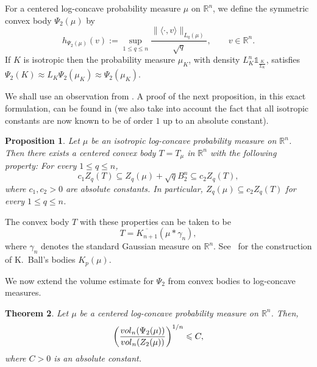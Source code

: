 \documentclass[10pt,a4paper]{amsart}
\newtheorem{theorem}{Theorem}[section]
\newtheorem{proposition}[theorem]{Proposition}
\numberwithin{equation}{section}
\newcommand{\ls}{\leqslant}
\begin{document}
For a centered log-concave probability measure $\mu$ on $\mathbb{R}^n$, we define the symmetric convex body $\Psi_{2}(\mu)$
by 
\begin{equation*} h_{\Psi_{2}(\mu)}(v ):= \sup_{1\ls q\ls n}\frac{\|\langle \cdot, v \rangle \|_{L_q(\mu)}}{\sqrt{q}}, \qquad v\in\mathbb{R}^n.\end{equation*} 
If $K$ is isotropic then the probability measure $\mu_K$, with density $L_K^n\mathds{1}_{\frac{K}{L_K}}$, satisfies $\Psi_2(K)\approx L_K\Psi_2(\mu_K)\approx \Psi_2(\mu_K)$.

We shall use an observation from \cite{GPV11}. A proof of the next proposition, in this exact formulation, can be found in \cite[Proposition~8.1.7]{BGVV-book}
(we also take into account the fact that all isotropic constants are now known to be of order $1$ up to an absolute constant).

\begin{proposition}\label{prop:Zq-control}
Let $\mu$ be an isotropic log-concave probability measure on $\mathbb{R}^n$. Then there exists a centered convex body $T=T_\mu$ in $\mathbb{R}^n$ with
the following property: For every $1\ls q\ls n$,
\begin{equation*}c_1Z_q(T)\subseteq Z_q(\mu)+\sqrt{q}B_2^n\subseteq c_2 Z_q(T),\end{equation*} 
where $c_1,c_2>0$ are absolute constants. In particular, $Z_q(\mu)\subseteq c_2Z_q(T)$ for every $1\ls q\ls n$.
\end{proposition} 

The convex body $T$ with these properties can be taken to be
\[T=\overline{K_{n+1}}(\mu\ast\gamma_n),\]
where $\gamma_n$ denotes the standard Gaussian measure on $\mathbb{R}^n$.
See~\cite[Chapter~2]{BGVV-book} for the construction of
K.~Ball's bodies $K_p(\mu)$.

\medskip

We now extend the volume estimate for $\Psi_2$ from convex bodies to
log-concave measures.

\begin{theorem}\label{th:vol-ratio-psi2-body-measure}
Let $\mu$ be a centered log-concave probability measure on $\mathbb{R}^n$. Then,
\begin{equation*}\left(\frac{{\rm vol}_n(\Psi_{2}(\mu))}{{\rm vol}_n(Z_{2}(\mu))}\right)^{1/n} \ls C,\end{equation*} 
where $C>0$ is an absolute constant. 
\end{theorem}
\end{document}
